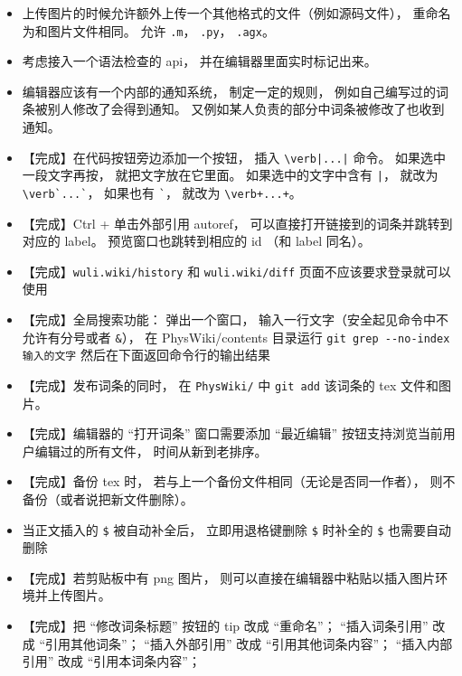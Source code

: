 \begin{itemize}
\item 上传图片的时候允许额外上传一个其他格式的文件（例如源码文件）， 重命名为和图片文件相同。 允许 \verb|.m|， \verb|.py|， \verb|.agx|。

\item 考虑接入一个语法检查的 api， 并在编辑器里面实时标记出来。

\item 编辑器应该有一个内部的通知系统， 制定一定的规则， 例如自己编写过的词条被别人修改了会得到通知。 又例如某人负责的部分中词条被修改了也收到通知。

\item 【完成】在代码按钮旁边添加一个按钮， 插入 \verb`\verb|...|` 命令。 如果选中一段文字再按， 就把文字放在它里面。 如果选中的文字中含有 \verb`|`， 就改为 \verb|\verb`...`|， 如果也有 \verb|`|， 就改为 \verb|\verb+...+|。

\item 【完成】Ctrl + 单击外部引用 autoref， 可以直接打开链接到的词条并跳转到对应的 label。 预览窗口也跳转到相应的 id （和 label 同名）。

\item 【完成】\verb|wuli.wiki/history| 和 \verb|wuli.wiki/diff| 页面不应该要求登录就可以使用

\item 【完成】全局搜索功能： 弹出一个窗口， 输入一行文字（安全起见命令中不允许有分号或者 \verb|&|）， 在 PhysWiki/contents 目录运行 \verb`git grep --no-index 输入的文字` 然后在下面返回命令行的输出结果

\item 【完成】发布词条的同时， 在 \verb|PhysWiki/| 中 \verb|git add| 该词条的 tex 文件和图片。

\item 【完成】编辑器的 “打开词条” 窗口需要添加 “最近编辑” 按钮支持浏览当前用户编辑过的所有文件， 时间从新到老排序。

\item 【完成】备份 tex 时， 若与上一个备份文件相同（无论是否同一作者）， 则不备份（或者说把新文件删除）。
\item 当正文插入的 \verb|$| 被自动补全后， 立即用退格键删除 \verb|$| 时补全的 \verb|$| 也需要自动删除

\item 【完成】若剪贴板中有 png 图片， 则可以直接在编辑器中粘贴以插入图片环境并上传图片。

\item 【完成】把 “修改词条标题” 按钮的 tip 改成 “重命名”； “插入词条引用” 改成 “引用其他词条”； “插入外部引用” 改成 “引用其他词条内容”； “插入内部引用” 改成 “引用本词条内容”；


\end{itemize}

